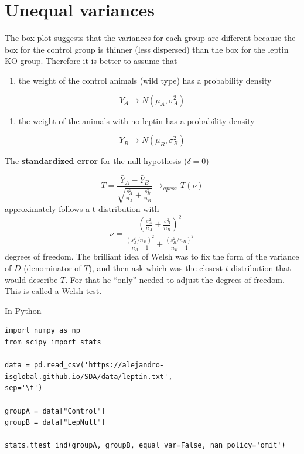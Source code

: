 \documentclass[
]{book}
\providecommand{\tightlist}{%
  \setlength{\itemsep}{0pt}\setlength{\parskip}{0pt}}
\begin{document}
\hypertarget{unequal-variances}{%
\section{Unequal variances}\label{unequal-variances}}

The box plot suggests that the variances for each group are different because the box for the control group is thinner (less dispersed) than the box for the leptin KO group. Therefore it is better to assume that

\begin{enumerate}
\def\labelenumi{\arabic{enumi}.}
\tightlist
\item
  the weight of the control animals (wild type) has a probability density
\end{enumerate}

\[Y_A \rightarrow N(\mu_A, \sigma_A^2)\]

\begin{enumerate}
\def\labelenumi{\arabic{enumi}.}
\setcounter{enumi}{1}
\tightlist
\item
  the weight of the animals with no leptin has a probability density
\end{enumerate}

\[Y_B \rightarrow N(\mu_B, \sigma_B^2)\]

The \textbf{standardized error} for the null hypothesis (\(\delta=0\))

\[T=\frac{\bar{Y}_A-\bar{Y}_B }{\sqrt{\frac{s_A^2}{n_A}+\frac{s_B^2}{n_B}}} \rightarrow_{aprox} T(\nu)\]
approximately follows a t-distribution with
\[\nu=\frac{(\frac{s_A^2}{n_A}+\frac{s_B^2}{n_B})^2}{\frac{(s_A^2/n_B)^2}{n_A-1}+\frac{(s_B^2/n_B)^2}{n_B-1}}\]
degrees of freedom. The brilliant idea of Welsh was to fix the form of the variance of \(D\) (denominator of \(T\)), and then ask which was the closest \(t\)-distribution that would describe \(T\). For that he ``only'' needed to adjust the degrees of freedom. This is called a Welsh test.

In Python

\begin{verbatim}
import numpy as np
from scipy import stats

data = pd.read_csv('https://alejandro-isglobal.github.io/SDA/data/leptin.txt', 
sep='\t')

groupA = data["Control"]
groupB = data["LepNull"]

stats.ttest_ind(groupA, groupB, equal_var=False, nan_policy='omit')
\end{verbatim}
\end{document}
